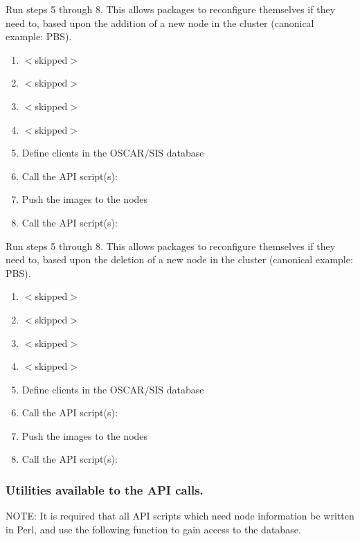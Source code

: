 
Run steps 5 through 8.  This allows packages to reconfigure themselves
if they need to, based upon the addition of a new node in the cluster
(canonical example: PBS).

\begin{enumerate}
\item $<$skipped$>$
\item $<$skipped$>$
\item $<$skipped$>$
\item $<$skipped$>$
\item Define clients in the OSCAR/SIS database
\item Call the API script(s): 
\item Push the images to the nodes
\item Call the API script(s): 
\end{enumerate}



Run steps 5 through 8.  This allows packages to reconfigure themselves
if they need to, based upon the deletion of a new node in the cluster
(canonical example: PBS).

\begin{enumerate}
\item $<$skipped$>$
\item $<$skipped$>$
\item $<$skipped$>$
\item $<$skipped$>$
\item Define clients in the OSCAR/SIS database
\item Call the API script(s): 
\item Push the images to the nodes
\item Call the API script(s): 
\end{enumerate}


\subsubsection{Utilities available to the API calls.}
\label{sec:api-utils}

NOTE: It is required that all API scripts which need node information be
written in Perl, and use the following function to gain access to the
database.

